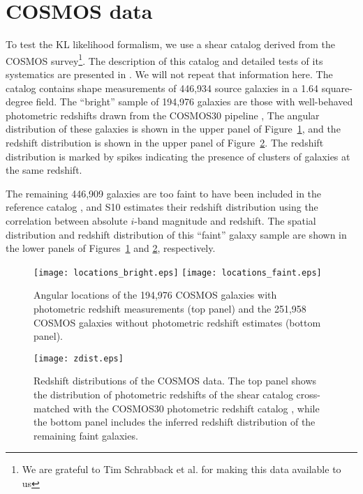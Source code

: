 \section{COSMOS data}
\label{sec:data}
To test the KL likelihood formalism, we use a shear catalog derived from the
COSMOS survey\footnote{We are grateful to Tim Schrabback et al. for making 
this data available to us}.  The description of this catalog and detailed 
tests of its systematics are presented in
\citet[][hereafter S10]{Schrabback10}.  We will not repeat that information
here.  The catalog contains shape measurements of 446,934 source galaxies 
in a 1.64 square-degree field.
The ``bright'' sample of 194,976 galaxies are those with well-behaved
photometric redshifts drawn from the COSMOS30 pipeline
\citep[][S10]{Hildebrandt2009},  The angular distribution of these
galaxies is shown in the upper panel of Figure~\ref{fig:COSMOS_locations},
and the redshift distribution is shown in the upper panel of
Figure~\ref{fig:COSMOS_zdist}.  The redshift distribution is marked by
spikes indicating the presence of clusters of galaxies at the same redshift.

The remaining 446,909 galaxies are too faint to have been included
in the reference catalog \citep[the COSMOS30 redshifts are limited to
$i^+ < 25$; See][]{Ilbert09}, and S10 estimates their redshift distribution
using the correlation between absolute $i$-band magnitude and redshift.
The spatial distribution and redshift distribution of this ``faint'' galaxy
sample are shown in the lower panels of Figures~\ref{fig:COSMOS_locations}
and \ref{fig:COSMOS_zdist}, respectively.

\begin{figure}
  \centering
  \texttt{[image: locations\_bright.eps]}
  \texttt{[image: locations\_faint.eps]}
  \caption{Angular locations of the 194,976 COSMOS galaxies with photometric
    redshift measurements (top panel)
    and the 251,958 COSMOS galaxies without photometric redshift estimates
    (bottom panel).}
  \label{fig:COSMOS_locations}
\end{figure}

\begin{figure}
  \centering
  \texttt{[image: zdist.eps]}
  \caption{Redshift distributions of the COSMOS data.  The top panel shows the
    distribution of photometric redshifts of the shear catalog cross-matched
    with the COSMOS30 photometric redshift catalog \citep{Ilbert09}, while
    the bottom panel includes the inferred redshift distribution of the
    remaining faint galaxies.}
  \label{fig:COSMOS_zdist}
\end{figure}

